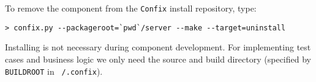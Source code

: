To remove the component from the {\tt Confix} install repository, type:

\begin{small}
\begin{verbatim}
> confix.py --packageroot=`pwd`/server --make --target=uninstall
\end{verbatim}
\end{small}

Installing is not necessary during component development. 
For implementing test cases and business logic we only need the source and
build directory (specified by {\tt BUILDROOT} in {\tt ~/.confix}).
 

